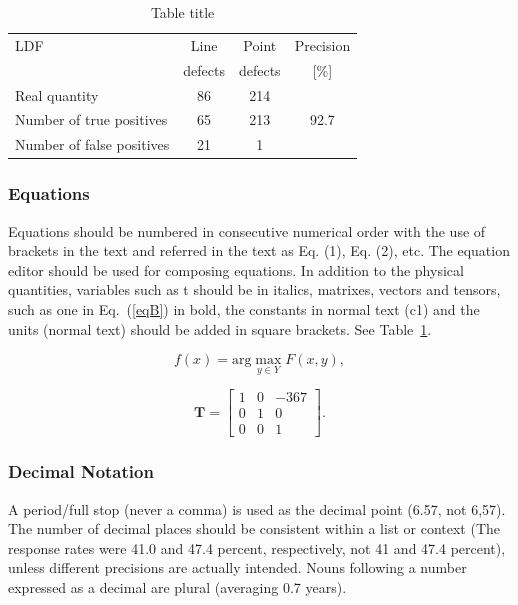 \documentclass[10pt]{JoME}
\begin{document}
\begin{table}[h]
\caption{Table title\label{tabA}}
\medskip\fontsize{10}{12}\selectfont
\begin{tabular}{lccc}
\hline
LDF	& Line &	Point  & Precision \\
          &  defects &  defects  &  [\%] \\
\hline
Real quantity  & 86   &  214  &   \\
Number of true positives  & 65	& 213 &  92.7  \\   	
Number of false positives & 21 & 1	\\
\hline
\end{tabular}
\end{table}

\subsubsection{Equations}

Equations should be numbered in consecutive numerical order with the use of brackets in the text and referred in the text as Eq. (1), Eq. (2), etc. The equation editor should be used for composing equations. In addition to the physical quantities, variables such as t should be in italics, matrixes, vectors and tensors, such as one in Eq.~(\ref{eqB}) in bold, the constants in normal text (c1) and the units (normal text) should be added in square brackets. See Table~\ref{tabA}.

\begin{equation}\label{eqA}
f(x) = \mbox{arg}\max_{y \in Y} F(x,y),
\end{equation}

\begin{equation}\label{eqB}
\mathbf{T} = \left[\begin{array}{ccc} 1 & 0 & -367 \\  0 & 1 & 0 \\ 0 & 0 & 1 \end{array}\right].
\end{equation}


\subsubsection{Decimal Notation}

A period/full stop (never a comma) is used as the decimal point (6.57, not 6,57). The number of decimal places should be consistent within a list or context (The response rates were 41.0 and 47.4 percent, respectively, not 41 and 47.4 percent), unless different precisions are actually intended. Nouns following a number expressed as a decimal are plural (averaging 0.7 years).
\end{document}
